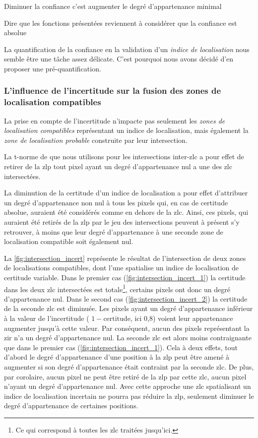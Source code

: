 Diminuer la confiance c'est augmenter le degré d'appartenance minimal

Dire que les fonctions présentées reviennent à considérer que la
confiance est absolue

La quantification de la confiance en la validation d'un \emph{indice
  de localisation} nous semble être une tâche assez délicate. C'est
pourquoi nous avons décidé d'en proposer une pré-quantification.

\subsubsection{L'influence de l'incertitude sur la fusion des zones de
  localisation compatibles}

La prise en compte de l'incertitude n'impacte pas seulement les
\emph{zones de localisation compatibles} représentant un indice de
localisation, mais également la \emph{zone de localisation probable}
construite par leur intersection.

La t-norme de  que nous utilisons pour les intersections
inter-\ac{zlc} a pour effet de retirer de la \ac{zlp} tout pixel ayant
un degré d'appartenance nul a une des \ac{zlc} intersectées.

La diminution de la certitude d'un indice de localisation a pour effet
d'attribuer un degré d'appartenance non nul à tous les pixels qui, en
cas de certitude absolue, auraient été considérés comme en dehors de
la \ac{zlc}. Ainsi, ces pixels, qui auraient été retirés de la
\ac{zlp} par le jeu des intersections peuvent à présent s'y retrouver,
à moins que leur degré d'appartenance à une seconde zone de
localisation compatible soit également nul.

La \autoref{fig:intersection_incert} représente le résultat de
l'intersection de deux zones de localisations compatibles, dont l'une
spatialise un indice de localisation de certitude variable. Dans le
premier cas (\ref{fig:intersection_incert_1}) la certitude dans les
deux \ac{zlc} intersectées est totale\footnote{Ce qui correspond à
  toutes les \ac{zlc} traitées jusqu'ici.}, certains pixels ont donc
un degré d'appartenance nul.
%
Dans le second cas (\ref{fig:intersection_incert_2}) la certitude de
la seconde \ac{zlc} est diminuée. Les pixels ayant un degré
d'appartenance inférieur à la valeur de l'incertitude (\ie
\(1-\text{certitude}\), ici 0,8) voient leur appartenance augmenter
jusqu'à cette valeur. Par conséquent, aucun des pixels représentant la
\ac{zir} n'a un degré d'appartenance nul. La seconde \ac{zlc} est
alors moins contraignante que dans le premier cas
(\ref{fig:intersection_incert_1}). Cela à deux effets, tout d'abord le
degré d'appartenance d'une position à la \ac{zlp} peut être amené à
augmenter si son degré d'appartenance était contraint par la seconde
\ac{zlc}. De plus, par corolaire, aucun pixel ne peut être retiré de
la \ac{zlp} par cette \ac{zlc}, aucun pixel n'ayant un degré
d'appartenance nul. Avec cette approche une \ac{zlc} spatialisant un
indice de localisation incertain ne pourra pas réduire la \ac{zlp},
seulement diminuer le degré d'appartenance de certaines positions.

